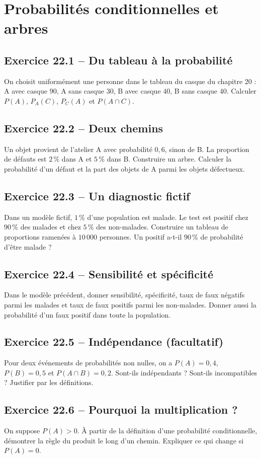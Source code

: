 \chapter{Probabilités conditionnelles et arbres}
\section*{Exercice 22.1 -- Du tableau à la probabilité}
On choisit uniformément une personne dans le tableau du casque du chapitre 20 : A avec casque $90$, A sans casque $30$, B avec casque $40$, B sans casque $40$. Calculer $P(A)$, $P_A(C)$, $P_C(A)$ et $P(A\cap C)$.

\section*{Exercice 22.2 -- Deux chemins}
Un objet provient de l'atelier A avec probabilité $0{,}6$, sinon de B. La proportion de défauts est $2\,\%$ dans A et $5\,\%$ dans B. Construire un arbre. Calculer la probabilité d'un défaut et la part des objets de A parmi les objets défectueux.

\section*{Exercice 22.3 -- Un diagnostic fictif}
Dans un modèle fictif, $1\,\%$ d'une population est malade. Le test est positif chez $90\,\%$ des malades et chez $5\,\%$ des non-malades. Construire un tableau de proportions ramenées à $10\,000$ personnes. Un positif a-t-il $90\,\%$ de probabilité d'être malade ?

\section*{Exercice 22.4 -- Sensibilité et spécificité}
Dans le modèle précédent, donner sensibilité, spécificité, taux de faux négatifs parmi les malades et taux de faux positifs parmi les non-malades. Donner aussi la probabilité d'un faux positif dans toute la population.

\section*{Exercice 22.5 -- Indépendance (facultatif)}
Pour deux événements de probabilités non nulles, on a $P(A)=0{,}4$, $P(B)=0{,}5$ et $P(A\cap B)=0{,}2$. Sont-ils indépendants ? Sont-ils incompatibles ? Justifier par les définitions.

\section*{Exercice 22.6 -- Pourquoi la multiplication ?}
On suppose $P(A)>0$. À partir de la définition d'une probabilité conditionnelle, démontrer la règle du produit le long d'un chemin. Expliquer ce qui change si $P(A)=0$.
